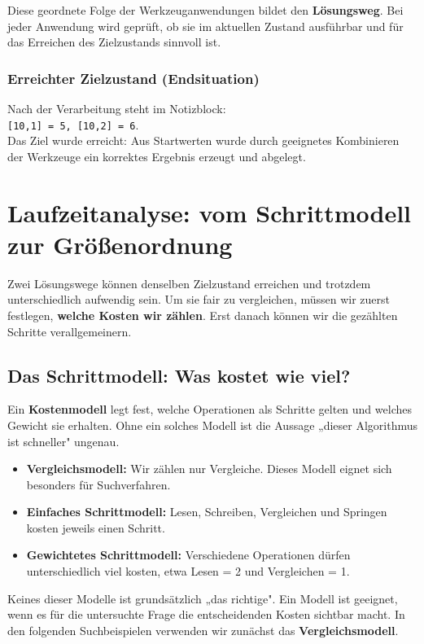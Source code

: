 \documentclass{article}
\begin{document}
    Diese geordnete Folge der Werkzeuganwendungen bildet den \textbf{Lösungsweg}. Bei jeder Anwendung wird geprüft, ob sie im aktuellen Zustand ausführbar und für das Erreichen des Zielzustands sinnvoll ist.

    \subsubsection{Erreichter Zielzustand (Endsituation)}
    Nach der Verarbeitung steht im Notizblock:\\
  		\texttt{[10,1] = 5, [10,2] = 6}.\\
    Das Ziel wurde erreicht: Aus Startwerten wurde durch geeignetes Kombinieren der Werkzeuge ein korrektes Ergebnis erzeugt und abgelegt.


      
\newpage
\section{Laufzeitanalyse: vom Schrittmodell zur Größenordnung}

Zwei Lösungswege können denselben Zielzustand erreichen und trotzdem unterschiedlich aufwendig sein. Um sie fair zu vergleichen, müssen wir zuerst festlegen, \textbf{welche Kosten wir zählen}. Erst danach können wir die gezählten Schritte verallgemeinern.

\subsection{Das Schrittmodell: Was kostet wie viel?}

Ein \textbf{Kostenmodell} legt fest, welche Operationen als Schritte gelten und welches Gewicht sie erhalten. Ohne ein solches Modell ist die Aussage „dieser Algorithmus ist schneller" ungenau.

\begin{itemize}
  \item \textbf{Vergleichsmodell:} Wir zählen nur Vergleiche. Dieses Modell eignet sich besonders für Suchverfahren.
  \item \textbf{Einfaches Schrittmodell:} Lesen, Schreiben, Vergleichen und Springen kosten jeweils einen Schritt.
  \item \textbf{Gewichtetes Schrittmodell:} Verschiedene Operationen dürfen unterschiedlich viel kosten, etwa Lesen = 2 und Vergleichen = 1.
\end{itemize}

Keines dieser Modelle ist grundsätzlich „das richtige". Ein Modell ist geeignet, wenn es für die untersuchte Frage die entscheidenden Kosten sichtbar macht. In den folgenden Suchbeispielen verwenden wir zunächst das \textbf{Vergleichsmodell}.
\end{document}
